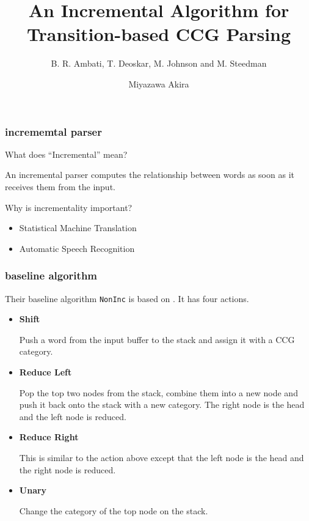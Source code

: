 \documentclass[10pt,usepdftitle=false,hyperref={unicode}]{beamer}
\title{\LARGE An Incremental Algorithm for Transition-based CCG Parsing}
\subtitle{\normalsize B. R. Ambati, T. Deoskar, M. Johnson and M. Steedman}
\author{Miyazawa Akira}
\institute{The Graduate University For Advanced Studies / National Institute of Informatics}
\begin{document}
\maketitle

\begin{frame}
    \frametitle{incrememtal parser}
    \nocite{ambati2015}
    What does ``Incremental'' mean?

    \begin{indentation}{10pt}{0pt}
        An incremental parser
        computes the relationship between words as soon as
        it receives them from the input.
    \end{indentation}

    \bigskip

    Why is incrementality important?
    \begin{itemize}
        \item Statistical Machine Translation
        \item Automatic Speech Recognition
    \end{itemize}
\end{frame}

\begin{frame}
    \frametitle{baseline algorithm}
    Their baseline algorithm \texttt{NonInc} is based on \cite{zhang2011}.
    It has four actions.
    \begin{itemize}
        \item \textbf{Shift}

            Push a word from the input buffer to the stack and assign it with a CCG category.

        \item \textbf{Reduce Left}

            Pop the top two nodes from the stack, combine them into a new node and push it back onto the stack with a new category.
            The right node is the head and the left node is reduced.

        \item \textbf{Reduce Right}

            This is similar to the action above except that the left node is the head and the right node is reduced.

        \item \textbf{Unary}

            Change the category of the top node on the stack.
    \end{itemize}
\end{frame}
\end{document}
